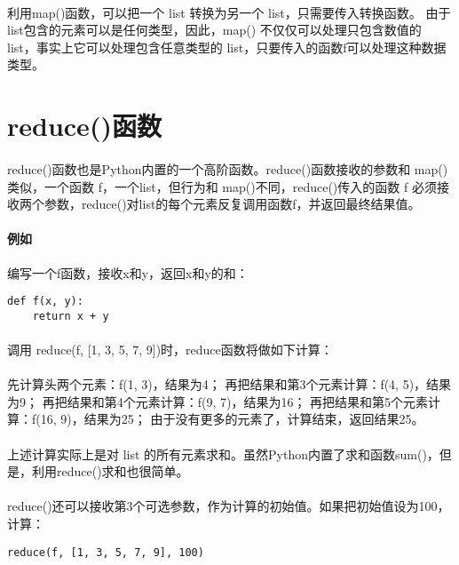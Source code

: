 \documentclass{article}
\begin{document}
\begin{CJK}{UTF8}{gbsn}
\paragraph{}
利用map()函数，可以把一个 list 转换为另一个 list，只需要传入转换函数。
由于list包含的元素可以是任何类型，因此，map() 不仅仅可以处理只包含数值的 list，事实上它可以处理包含任意类型的 list，只要传入的函数f可以处理这种数据类型。
\section{reduce()函数}
\paragraph{}
reduce()函数也是Python内置的一个高阶函数。reduce()函数接收的参数和 map()类似，一个函数 f，一个list，但行为和 map()不同，reduce()传入的函数 f 必须接收两个参数，reduce()对list的每个元素反复调用函数f，并返回最终结果值。
\paragraph{例如}
编写一个f函数，接收x和y，返回x和y的和：
\begin{verbatim}
def f(x, y):
    return x + y
\end{verbatim}
\paragraph{}
调用 reduce(f, [1, 3, 5, 7, 9])时，reduce函数将做如下计算：
\paragraph{}
先计算头两个元素：f(1, 3)，结果为4；
再把结果和第3个元素计算：f(4, 5)，结果为9；
再把结果和第4个元素计算：f(9, 7)，结果为16；
再把结果和第5个元素计算：f(16, 9)，结果为25；
由于没有更多的元素了，计算结束，返回结果25。
\paragraph{}
上述计算实际上是对 list 的所有元素求和。虽然Python内置了求和函数sum()，但是，利用reduce()求和也很简单。
\paragraph{}
reduce()还可以接收第3个可选参数，作为计算的初始值。如果把初始值设为100，计算：
\begin{verbatim}
reduce(f, [1, 3, 5, 7, 9], 100)
\end{verbatim}

\end{CJK}
\end{document}

